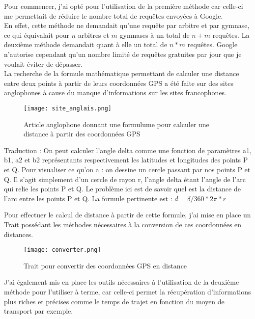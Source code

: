 Pour commencer, j’ai opté pour l’utilisation de la première méthode car celle-ci me permettait de réduire le nombre total de requêtes envoyées à Google.\\ 

En effet, cette méthode ne demandait qu’une requête par arbitre et par gymnase, ce qui équivalait pour $n$  arbitres et $m$ gymnases à un total de $n + m$  requêtes. La deuxième méthode demandait quant à elle un total de $n * m$ requêtes. Google n’autorise cependant qu’un nombre limité de requêtes gratuites par jour que je voulait éviter de dépasser.\\

La recherche de la formule mathématique permettant de calculer une distance entre deux points à partir de leurs coordonnées GPS a été faite sur des sites anglophones à cause du manque d’informations sur les sites francophones.

\newpage 

\begin{figure}
    \centering
    \texttt{[image: site\_anglais.png]}
    \caption{Article anglophone donnant une formulume pour calculer une distance à partir des coordonnées GPS}
\end{figure}

\begin{commentaire}
    Traduction : On peut calculer l’angle delta comme une fonction de paramètres a1, b1, a2 et b2 représentants respectivement les latitudes et longitudes des points P et Q. 
    Pour visualiser ce qu’on a : on dessine un cercle passant par nos points P et Q.
    Il s’agit simplement d’un cercle de rayon r, l’angle delta étant l’angle de l’arc qui relie les points P et Q. Le problème ici est de savoir quel est la distance de l’arc entre les points P et Q. La formule pertinente est : $d = \delta/360 * 2\pi * r$
\end{commentaire}

Pour effectuer le calcul de distance à partir de cette formule, j’ai mise en place un Trait possédant les méthodes nécessaires à la conversion de ces coordonnées en distances.

\begin{figure}[!h]
    \centering
    \texttt{[image: converter.png]}
    \caption{Trait pour convertir des coordonnées GPS en distance}
\end{figure}

J’ai également mis en place les outils nécessaires à l’utilisation de la deuxième méthode pour l’utiliser à terme, car celle-ci permet la récupération d’informations plus riches et précises comme le temps de trajet en fonction du moyen de transport par exemple.

